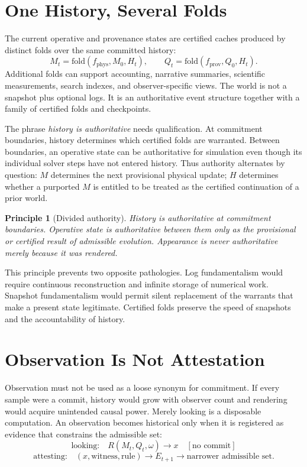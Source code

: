 \documentclass[11pt]{article}
\newtheorem{principle}{Principle}
\begin{document}
\section{One History, Several Folds}
\label{sec:folds}

The current operative and provenance states are certified caches produced by distinct folds over the same committed history:
\[
M_t = \mathrm{fold}(f_{\mathrm{phys}}, M_0, H_t), \qquad Q_t = \mathrm{fold}(f_{\mathrm{prov}}, Q_0, H_t).
\]
Additional folds can support accounting, narrative summaries, scientific measurements, search indexes, and observer-specific views. The world is not a snapshot plus optional logs. It is an authoritative event structure together with a family of certified folds and checkpoints.

The phrase \emph{history is authoritative} needs qualification. At commitment boundaries, history determines which certified folds are warranted. Between boundaries, an operative state can be authoritative for simulation even though its individual solver steps have not entered history. Thus authority alternates by question: $M$ determines the next provisional physical update; $H$ determines whether a purported $M$ is entitled to be treated as the certified continuation of a prior world.

\begin{principle}[Divided authority]
\label{prin:divided-authority}
History is authoritative at commitment boundaries. Operative state is authoritative between them only as the provisional or certified result of admissible evolution. Appearance is never authoritative merely because it was rendered.
\end{principle}

This principle prevents two opposite pathologies. Log fundamentalism would require continuous reconstruction and infinite storage of numerical work. Snapshot fundamentalism would permit silent replacement of the warrants that make a present state legitimate. Certified folds preserve the speed of snapshots and the accountability of history.

\section{Observation Is Not Attestation}
\label{sec:attestation}

Observation must not be used as a loose synonym for commitment. If every sample were a commit, history would grow with observer count and rendering would acquire unintended causal power. Merely looking is a disposable computation. An observation becomes historical only when it is registered as evidence that constrains the admissible set:
\[
\text{looking:} \quad R(M_t, Q_t, \omega) \to x \quad [\text{no commit}]
\]
\[
\text{attesting:} \quad (x, \text{witness}, \text{rule}) \to E_{t+1} \to \text{narrower admissible set}.
\]
\end{document}
